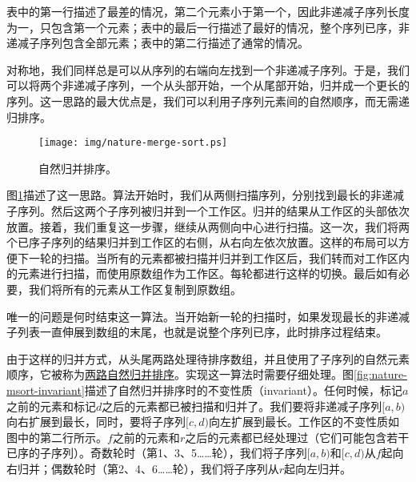 \documentclass[UTF8]{article}
\begin{document}
表中的第一行描述了最差的情况，第二个元素小于第一个，因此非递减子序列长度为一，只包含第一个元素；表中的最后一行描述了最好的情况，整个序列已序，非递减子序列包含全部元素；表中的第二行描述了通常的情况。

对称地，我们同样总是可以从序列的右端向左找到一个非递减子序列。于是，我们可以将两个非递减子序列，一个从头部开始，一个从尾部开始，归并成一个更长的序列。这一思路的最大优点是，我们可以利用子序列元素间的自然顺序，而无需递归排序。

\begin{figure}[htbp]
 \centering
 \texttt{[image: img/nature-merge-sort.ps]}
 \caption{自然归并排序。}
 \label{fig:nature-merge-sort}
\end{figure}

图\ref{fig:nature-merge-sort}描述了这一思路。算法开始时，我们从两侧扫描序列，分别找到最长的非递减子序列。然后这两个子序列被归并到一个工作区。归并的结果从工作区的头部依次放置。接着，我们重复这一步骤，继续从两侧向中心进行扫描。这一次，我们将两个已序子序列的结果归并到工作区的右侧，从右向左依次放置。这样的布局可以方便下一轮的扫描。当所有的元素都被扫描并归并到工作区后，我们转而对工作区内的元素进行扫描，而使用原数组作为工作区。每轮都进行这样的切换。最后如有必要，我们将所有的元素从工作区复制到原数组。

唯一的问题是何时结束这一算法。当开始新一轮的扫描时，如果发现最长的非递减子列表一直伸展到数组的末尾，也就是说整个序列已序，此时排序过程结束。

由于这样的归并方式，从头尾两路处理待排序数组，并且使用了子序列的自然元素顺序，它被称为\underline{两路自然归并排序}。实现这一算法时需要仔细处理。图\ref{fig:nature-msort-invariant}描述了自然归并排序时的不变性质（invariant）。任何时候，标记$a$之前的元素和标记$d$之后的元素都已被扫描和归并了。我们要将非递减子序列$[a, b)$向右扩展到最长，同时，要将子序列$[c, d)$向左扩展到最长。工作区的不变性质如图中的第二行所示。$f$之前的元素和$r$之后的元素都已经处理过（它们可能包含若干已序的子序列）。奇数轮时（第1、3、5……轮），我们将子序列$[a, b)$和$[c, d)$从$f$起向右归并；偶数轮时（第2、4、6……轮），我们将子序列从$r$起向左归并。
\end{document}
